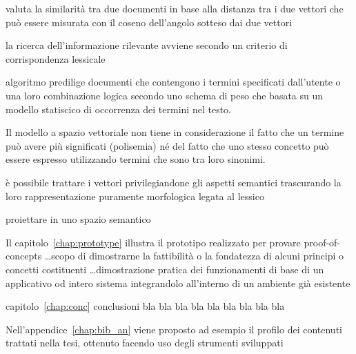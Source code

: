 valuta la similarità tra due documenti in base alla distanza tra i due vettori che può essere misurata con il coseno dell'angolo sotteso dai due vettori

la ricerca dell'informazione rilevante avviene secondo un criterio di corrispondenza lessicale

algoritmo predilige documenti che contengono i termini specificati dall'utente o una loro combinazione logica secondo uno schema di peso che basata su un modello statiscico di occorrenza dei termini nel testo.

Il modello a spazio vettoriale non tiene in considerazione il fatto che un termine può avere più significati (polisemia) né del fatto che uno stesso concetto può essere espresso utilizzando termini che sono tra loro sinonimi.

è possibile trattare i vettori privilegiandone gli aspetti semantici trascurando la loro rappresentazione puramente morfologica legata al lessico

proiettare in uno spazio semantico




Il capitolo~\ref{chap:prototype} illustra il prototipo realizzato per provare proof-of-concepts \ldots scopo di dimostrarne la fattibilità o la fondatezza di alcuni principi o concetti costituenti \ldots dimostrazione pratica dei funzionamenti di base di un applicativo od intero sistema integrandolo all'interno di un ambiente già esistente


capitolo~\ref{chap:conc} conclusioni
bla bla bla
bla bla bla
bla bla bla

Nell'appendice~\ref{chap:bib_an} viene proposto ad esempio il profilo dei contenuti trattati nella tesi, ottenuto facendo uso degli strumenti sviluppati 

